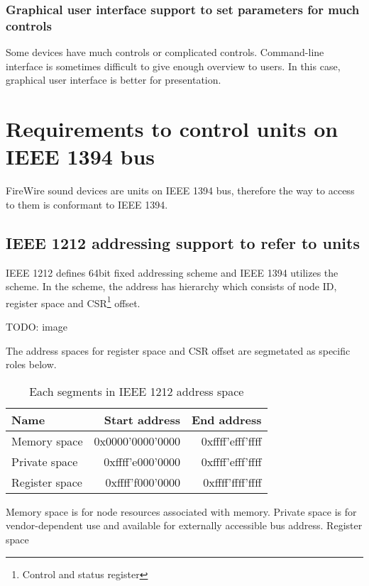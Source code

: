 \documentclass[onecolumn]{article}
\begin{document}
\subsubsection{Graphical user interface support to set parameters for much controls}

Some devices have much controls or complicated controls. Command-line interface is sometimes difficult to give enough overview to users. In this case, graphical user interface is better for presentation.


\section{Requirements to control units on IEEE 1394 bus}

FireWire sound devices are units on IEEE 1394 bus, therefore the way to access to them is conformant to IEEE 1394.

\subsection{IEEE 1212 addressing support to refer to units}

IEEE 1212 defines 64bit fixed addressing scheme and IEEE 1394 utilizes the scheme. In the scheme, the address has hierarchy which consists of node ID, register space and CSR\footnote{Control and status register} offset.

TODO: image

The address spaces for register space and CSR offset are segmetated as specific roles below.


\begin{table}[ht]
	\centering
	\caption{{Each segments in IEEE 1212 address space}}
	\label{syt_interval}
	\begin{tabular}{lrr}
		\toprule
		Name		& Start address	   & End address \\
		\midrule
		Memory space	& 0x0000'0000'0000 & 0xffff'efff'ffff \\
		Private space	& 0xffff'e000'0000 & 0xffff'efff'ffff \\
		Register space	& 0xffff'f000'0000 & 0xffff'ffff'ffff \\
		\bottomrule
	\end{tabular}
\end{table}

Memory space is for node resources associated with memory. Private space is for vendor-dependent use and available for externally accessible bus address. Register space
\end{document}
